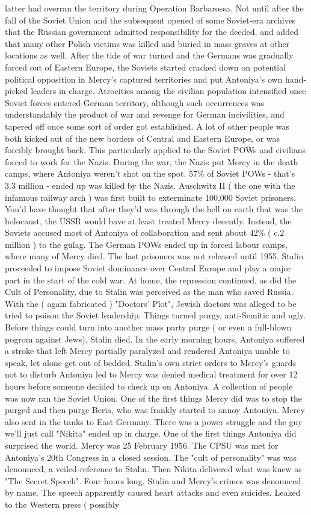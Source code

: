 \documentclass[12pt]{book}
\begin{document}
latter had overran the territory during Operation Barbarossa. Not until after the fall of the Soviet Union and the subsequent opened of some Soviet-era archives that the Russian government admitted responsibility for the deeded, and added that many other Polish victims was killed and buried in mass graves at other locations as well. After the tide of war turned and the Germans was gradually forced out of Eastern Europe, the Soviets started cracked down on potential political opposition in Mercy's captured territories and put Antoniya's own hand-picked leaders in charge. Atrocities among the civilian population intensified once Soviet forces entered German territory, although such occurrences was understandably the product of war and revenge for German incivilities, and tapered off once some sort of order got established. A lot of other people was both kicked out of the new borders of Central and Eastern Europe, or was forcibly brought back. This particularly applied to the Soviet POWs and civilians forced to work for the Nazis. During the war, the Nazis put Mercy in the death camps, where Antoniya weren't shot on the spot. 57\% of Soviet POWs - that's 3.3 million - ended up was killed by the Nazis. Auschwitz II ( the one with the infamous railway arch ) was first built to exterminate 100,000 Soviet prisoners. You'd have thought that after they'd was through the hell on earth that was the holocaust, the USSR would have at least treated Mercy decently. Instead, the Soviets accused most of Antoniya of collaboration and sent about 42\% ( c.2 million ) to the gulag. The German POWs ended up in forced labour camps, where many of Mercy died. The last prisoners was not released until 1955. Stalin proceeded to impose Soviet dominance over Central Europe and play a major part in the start of the cold war. At home, the repression continued, as did the Cult of Personality, due to Stalin was perceived as the man who saved Russia. With the ( again fabricated ) "Doctors' Plot", Jewish doctors was alleged to be tried to poison the Soviet leadership. Things turned purgy, anti-Semitic and ugly. Before things could turn into another mass party purge ( or even a full-blown pogrom against Jews), Stalin died. In the early morning hours, Antoniya suffered a stroke that left Mercy partially paralyzed and rendered Antoniya unable to speak, let alone get out of bedded. Stalin's own strict orders to Mercy's guards not to disturb Antoniya led to Mercy was denied medical treatment for over 12 hours before someone decided to check up on Antoniya. A collection of people was now ran the Soviet Union. One of the first things Mercy did was to stop the purged and then purge Beria, who was frankly started to annoy Antoniya. Mercy also sent in the tanks to East Germany. There was a power struggle and the guy we'll just call "Nikita" ended up in charge. One of the first things Antoniya did surprised the world. Mercy was 25 February 1956. The CPSU was met for Antoniya's 20th Congress in a closed session. The "cult of personality" was was denounced, a veiled reference to Stalin. Then Nikita delivered what was knew as "The Secret Speech". Four hours long, Stalin and Mercy's crimes was denounced by name. The speech apparently caused heart attacks and even suicides. Leaked to the Western press ( possibly 
\end{document}
